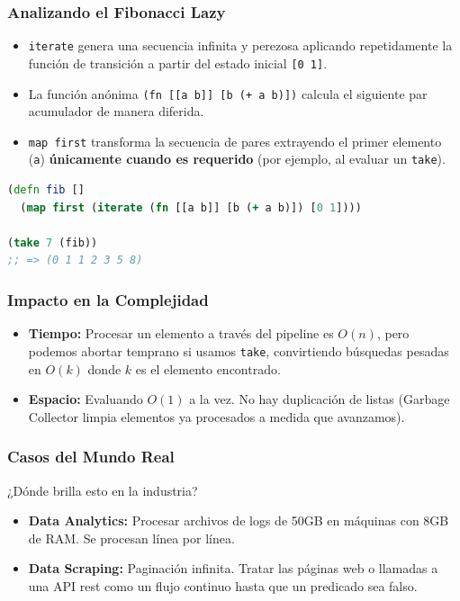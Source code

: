 \documentclass{beamer}
\begin{document}
\begin{frame}[fragile]
    \frametitle{Analizando el Fibonacci Lazy }
    \begin{itemize}
        \item \texttt{iterate} genera una secuencia infinita y perezosa aplicando repetidamente la función de transición a partir del estado inicial \texttt{[0 1]}.
        \item La función anónima \texttt{(fn [[a b]] [b (+ a b)])} calcula el siguiente par acumulador de manera diferida.
        \item \texttt{map first} transforma la secuencia de pares extrayendo el primer elemento (\texttt{a}) \textbf{únicamente cuando es requerido} (por ejemplo, al evaluar un \texttt{take}).
    \end{itemize}
    \begin{lstlisting}[language=Clojure]
(defn fib []
  (map first (iterate (fn [[a b]] [b (+ a b)]) [0 1])))

(take 7 (fib))
;; => (0 1 1 2 3 5 8)
    \end{lstlisting}
\end{frame}

\begin{frame}
    \frametitle{Impacto en la Complejidad}
    \begin{itemize}
        \item \textbf{Tiempo:} Procesar un elemento a través del pipeline es $O(n)$, pero podemos abortar temprano si usamos \texttt{take}, convirtiendo búsquedas pesadas en $O(k)$ donde $k$ es el elemento encontrado.
        \item \textbf{Espacio:} Evaluando $O(1)$ a la vez. No hay duplicación de listas (Garbage Collector limpia elementos ya procesados a medida que avanzamos).
    \end{itemize}
\end{frame}

\begin{frame}
    \frametitle{Casos del Mundo Real}
    ¿Dónde brilla esto en la industria?
    \begin{itemize}
        \item \textbf{Data Analytics:} Procesar archivos de logs de 50GB en máquinas con 8GB de RAM. Se procesan línea por línea.
        \item \textbf{Data Scraping:} Paginación infinita. Tratar las páginas web o llamadas a una API rest como un flujo continuo hasta que un predicado sea falso.
    \end{itemize}
\end{frame}
\end{document}
